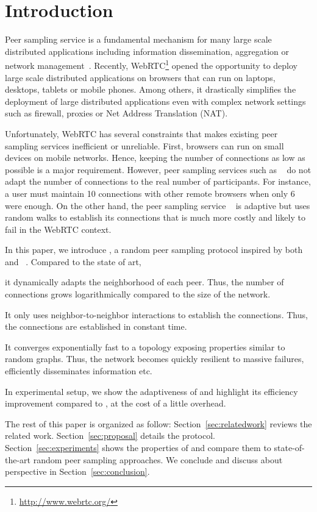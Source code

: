 
\section{Introduction}

Peer sampling service is a fundamental mechanism for many large scale
distributed applications including information dissemination, aggregation or
network management~\cite{jelasity2007gossip}. Recently,
WebRTC\footnote{\url{http://www.webrtc.org/}} opened the opportunity to deploy
large scale distributed applications on browsers that can run on laptops,
desktops, tablets or mobile phones. Among others, it drastically simplifies the
deployment of large distributed applications even with complex network settings
such as firewall, proxies or Net Address Translation (NAT).

Unfortunately, WebRTC has several constraints that makes existing peer
sampling services inefficient or unreliable. First, browsers can run
on small devices on mobile networks. Hence, keeping the number of
connections as low as possible is a major requirement. However, peer
sampling services such as \CYCLON{}~\cite{voulgaris2005cyclon} do not
adapt the number of connections to the real number of
participants. For instance, a user must maintain 10 connections with
other remote browsers when only 6 were enough. On the other hand, the
peer sampling service \SCAMP{}~\cite{ganesh2003peer} is adaptive but
uses random walks to establish its connections that is much more
costly and likely to fail in the WebRTC context.

In this paper, we introduce \SPRAY{}, a random peer sampling protocol inspired
by both \CYCLON{}~\cite{voulgaris2005cyclon} and
\SCAMP{}~\cite{ganesh2003peer}. Compared to the state of art,
\begin{inparaenum}[(i)]
\item it dynamically adapts the neighborhood of each peer. Thus, the number of
  connections grows logarithmically compared to the size of the network.
\item It only uses neighbor-to-neighbor interactions to establish the
  connections. Thus, the connections are established in constant time.
\item It converges exponentially fast to a topology exposing properties similar
  to random graphs. Thus, the network becomes quickly resilient to massive
  failures, efficiently disseminates information etc.
\item In experimental setup, we show the adaptiveness of \SPRAY{} and
  highlight its efficiency improvement compared to \CYCLON{}, at the cost of a
  little overhead.
\end{inparaenum}

The rest of this paper is organized as follow: Section~\ref{sec:relatedwork}
reviews the related work. Section~\ref{sec:proposal} details the \SPRAY{}
protocol.  Section~\ref{sec:experiments} shows the properties of \SPRAY{}
and compare them to state-of-the-art random peer sampling approaches. We
conclude and discuss about perspective in Section~\ref{sec:conclusion}.

